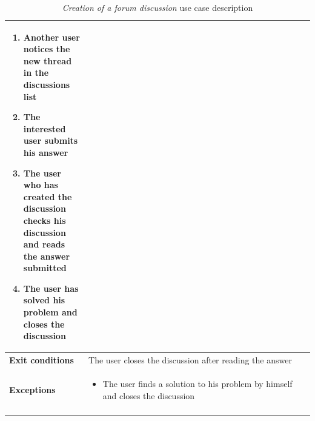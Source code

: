 \documentclass[10pt]{article}
\begin{document}
\begin{enumerate}[label=\textbf{UC\arabic*}]
\begin{longtable}{p{0.26\linewidth}p{0.75\linewidth}}
\begin{enumerate}
                \item Another user notices the new thread in the discussions list
                \item The interested user submits his answer
                \item The user who has created the discussion checks his discussion and reads the answer submitted
                \item The user has solved his problem and closes the discussion
            \end{enumerate} \\
            \midrule
            \textbf{Exit conditions} & The user closes the discussion after reading the answer\\
            \midrule
            \textbf{Exceptions} & 
            \begin{itemize}
                \item The user finds a solution to his problem by himself and closes the discussion 
            \end{itemize} \\
            \bottomrule
            \caption{\emph{Creation of a forum discussion} use case description}
        \end{longtable}
    \newpage
\end{enumerate}
\end{document}
